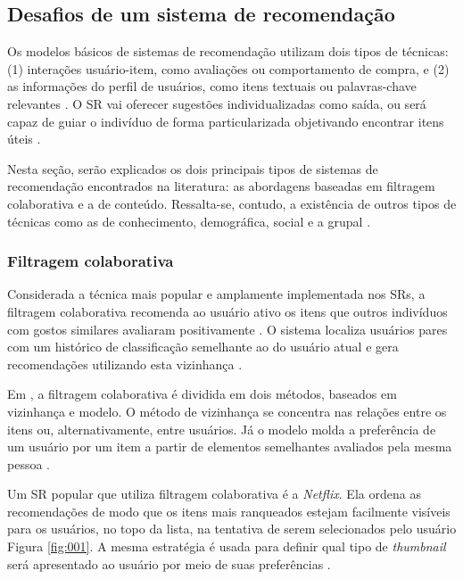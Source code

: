 \documentclass[portuguese]{textolivre}
\begin{document}
\subsection{Desafios de um sistema de recomendação}

Os modelos básicos de sistemas de recomendação utilizam dois tipos de técnicas: (1) interações usuário-item, como avaliações ou comportamento de compra, e (2) as informações do perfil de usuários, como itens textuais ou palavras-chave relevantes \cite{Aggarwal2016}. O SR vai oferecer sugestões individualizadas como saída, ou será capaz de guiar o indivíduo de forma particularizada objetivando encontrar itens úteis \cite{Burke:2007}.

Nesta seção, serão explicados os dois principais tipos de sistemas de recomendação encontrados na literatura: as abordagens baseadas em filtragem colaborativa e a de conteúdo. Ressalta-se, contudo, a existência de outros tipos de técnicas como as de conhecimento, demográfica, social e a grupal \cite{Burke:2007}.

\subsubsection{Filtragem colaborativa}

Considerada a técnica mais popular e amplamente implementada nos SRs, a filtragem colaborativa recomenda ao usuário ativo os itens que outros indivíduos com gostos similares avaliaram positivamente \cite{Ricci2011}. O sistema localiza usuários pares com um histórico de classificação semelhante ao do usuário atual e gera recomendações utilizando esta vizinhança \cite{Burke:2007}.


Em \textcite{Burke:2007}, a filtragem colaborativa é dividida em dois métodos, baseados em vizinhança e modelo. O método de vizinhança se concentra nas relações entre os itens ou, alternativamente, entre usuários. Já o modelo molda a preferência de um usuário por um item a partir de elementos semelhantes avaliados pela mesma pessoa \cite{Ricci2011}. 


Um SR popular que utiliza filtragem colaborativa é a \emph{Netflix}. Ela ordena as recomendações de modo que os itens mais ranqueados estejam facilmente visíveis para os usuários, no topo da lista, na tentativa de serem selecionados pelo usuário Figura \ref{fig:001}. A mesma estratégia é usada para definir qual tipo de \emph{thumbnail} será apresentado ao usuário por meio de suas preferências \cite{Azevedo:2018}.
\end{document}
